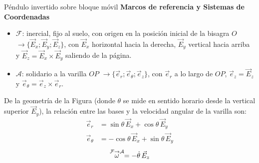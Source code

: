 \begin{solucion}{Péndulo invertido sobre bloque móvil}
\textbf{Marcos de referencia y Sistemas de Coordenadas}
\begin{itemize}
    \item $\mathcal{F}$: inercial, fijo al suelo, con origen en la posición inicial de la bisagra $O$ $\longrightarrow\{\vec{E}_x;\vec{E}_y;\vec{E}_z\}$, con $\vec{E}_x$ horizontal hacia la derecha, $\vec{E}_y$ vertical hacia arriba y $\vec{E}_z=\vec{E}_x\times\vec{E}_y$ saliendo de la página.
    \item $\mathcal{A}$: solidario a la varilla $OP$ $\longrightarrow\{\vec{e}_r;\vec{e}_\theta;\vec{e}_z\}$, con $\vec{e}_r$ a lo largo de $OP$, $\vec{e}_z=\vec{E}_z$ y $\vec{e}_\theta=\vec{e}_z\times\vec{e}_r$.
\end{itemize}

\begin{center}
\end{center}

De la geometría de la Figura (donde $\theta$ se mide en sentido horario desde la vertical superior $\vec{E}_y$), la relación entre las bases y la velocidad angular de la varilla son:
\begin{equation*}
\begin{split}
    \vec{e}_r &= \sin\theta\,\vec{E}_x + \cos\theta\,\vec{E}_y\\
    \vec{e}_\theta &= -\cos\theta\,\vec{E}_x + \sin\theta\,\vec{E}_y
\end{split}
\end{equation*}
$$\stackrel{\mathcal{F} \to \mathcal{A}}{\omega} = -\dot{\theta}\,\vec{E}_z$$


\end{solucion}
